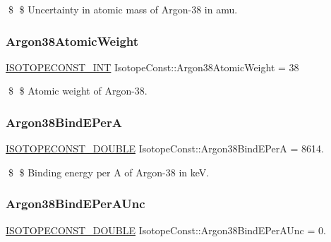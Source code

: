 \$ \$ Uncertainty in atomic mass of Argon-\/38 in amu. \mbox{\label{group___isotope_const-_argon-_ar38_ga6017c7e353e69a2620127556a1354f41}} 
\subsubsection{\texorpdfstring{Argon38\+Atomic\+Weight}{Argon38AtomicWeight}}
{\footnotesize\ttfamily \mbox{\hyperlink{group___isotope_const-_macros_ga5f18360b3e99483a35c32d789e62621c}{I\+S\+O\+T\+O\+P\+E\+C\+O\+N\+S\+T\+\_\+\+I\+NT}} Isotope\+Const\+::\+Argon38\+Atomic\+Weight = 38}

\$ \$ Atomic weight of Argon-\/38. \mbox{\label{group___isotope_const-_argon-_ar38_ga11cfd605a76cdc6a03cb419006153428}} 
\subsubsection{\texorpdfstring{Argon38\+Bind\+E\+PerA}{Argon38BindEPerA}}
{\footnotesize\ttfamily \mbox{\hyperlink{group___isotope_const-_macros_ga8f45a7272ce02c0b4c65c44636ed719a}{I\+S\+O\+T\+O\+P\+E\+C\+O\+N\+S\+T\+\_\+\+D\+O\+U\+B\+LE}} Isotope\+Const\+::\+Argon38\+Bind\+E\+PerA = 8614.}

\$ \$ Binding energy per A of Argon-\/38 in keV. \mbox{\label{group___isotope_const-_argon-_ar38_ga10000713ebc5ebce5522784a2856d114}} 
\subsubsection{\texorpdfstring{Argon38\+Bind\+E\+Per\+A\+Unc}{Argon38BindEPerAUnc}}
{\footnotesize\ttfamily \mbox{\hyperlink{group___isotope_const-_macros_ga8f45a7272ce02c0b4c65c44636ed719a}{I\+S\+O\+T\+O\+P\+E\+C\+O\+N\+S\+T\+\_\+\+D\+O\+U\+B\+LE}} Isotope\+Const\+::\+Argon38\+Bind\+E\+Per\+A\+Unc = 0.}

